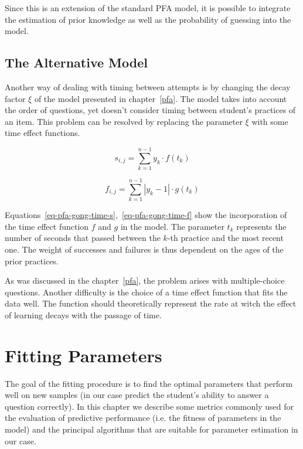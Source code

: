 Since this is an extension of the standard PFA model, it is possible to integrate the estimation of prior knowledge as well as the probability of guessing into the model.

\subsection{The Alternative Model}
\label{pfagt}

Another way of dealing with timing between attempts is by changing the decay factor $\xi$ of the model presented in chapter~\ref{pfa}. The model takes into account the order of questions, yet doesn't consider timing between student's practices of an item. This problem can be resolved by replacing the parameter $\xi$ with some time effect functions.

\begin{equation} \label{eq-pfa-gong-time-s}
  s_{i,j} = \sum_{k=1}^{n-1} y_k \cdot f(t_k)
\end{equation}

\begin{equation} \label{eq-pfa-gong-time-f}
  f_{i,j} = \sum_{k=1}^{n-1} |y_k - 1| \cdot g(t_k)
\end{equation}

Equations~\ref{eq-pfa-gong-time-s},~\ref{eq-pfa-gong-time-f} show the incorporation of the time effect function $f$ and $g$ in the model. The parameter $t_k$ represents the number of seconds that passed between the $k$-th practice and the most recent one. The weight of successes and failures is thus dependent on the ages of the prior practices.

As was discussed in the chapter~\ref{pfa}, the problem arises with multiple-choice questions. Another difficulty is the choice of a time effect function that fits the data well. The function should theoretically represent the rate at witch the effect of learning decays with the passage of time.

\section{Fitting Parameters}

The goal of the fitting procedure is to find the optimal parameters that perform well on new samples (in our case predict the student's ability to answer a question correctly). In this chapter we describe some metrics commonly used for the evaluation of predictive performance (i.e. the fitness of parameters in the model) and the principal algorithms that are suitable for parameter estimation in our case.

